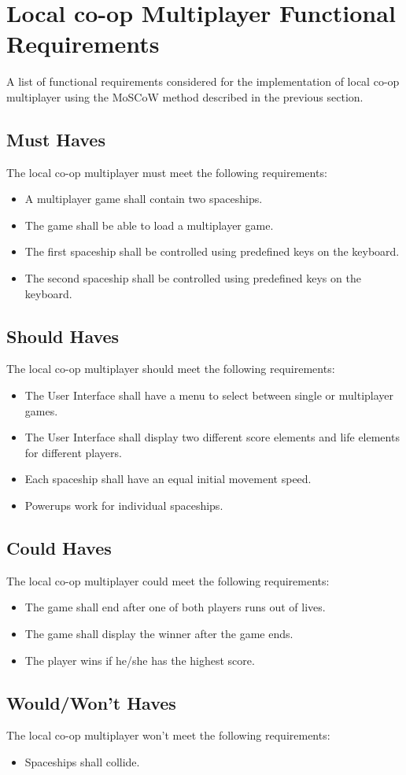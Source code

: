 \section{Local co-op Multiplayer Functional Requirements}

A list of functional requirements considered for the implementation of local co-op multiplayer using the MoSCoW method described in the previous section.

\subsection{Must Haves}
The local co-op multiplayer must meet the following requirements:
\begin{itemize}
	\item A multiplayer game shall contain two spaceships.
	\item The game shall be able to load a multiplayer game.
	\item The first spaceship shall be controlled using predefined keys on the keyboard.
	\item The second spaceship shall be controlled using predefined keys on the keyboard.
\end{itemize}

\subsection{Should Haves}
The local co-op multiplayer should meet the following requirements:
\begin{itemize}
	\item The User Interface shall have a menu to select between single or multiplayer games.
	\item The User Interface shall display two different score elements and life elements for different players.
	\item Each spaceship shall have an equal initial movement speed.
	\item Powerups work for individual spaceships.
\end{itemize}

\subsection{Could Haves}
The local co-op multiplayer could meet the following requirements:
\begin{itemize}
	\item The game shall end after one of both players runs out of lives.
	\item The game shall display the winner after the game ends.
	\item The player wins if he/she has the highest score.
\end{itemize}

\subsection{Would/Won't Haves}
The local co-op multiplayer won't meet the following requirements:
\begin{itemize}
	\item Spaceships shall collide.
\end{itemize}